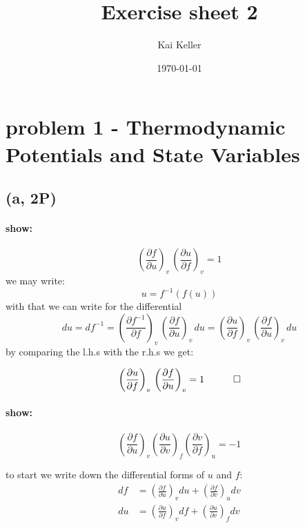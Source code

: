 \documentclass[a4paper]{article}
\title{Exercise sheet 2}
\author{Kai Keller}
\date{\today}
\begin{document}
\maketitle
\tableofcontents

\section{problem 1 - Thermodynamic Potentials and State Variables}
\subsection{(a, 2P)}
\paragraph{show:}
\begin{equation}
    \left(\frac{\partial f}{\partial u}\right)_v \, \left(\frac{\partial u}{\partial f}\right)_v = 1 
\end{equation} 
we may write:
\begin{equation}
    u=f^{-1}\left(f(u)\right)
\end{equation}
with that we can write for the differential
\begin{equation}
    du=df^{-1}=\left(\frac{\partial f^{-1}}{\partial f}\right)_v\,\left(\frac{\partial f}{\partial u}\right)_v\, du=\left(\frac{\partial u}{\partial f}\right)_v\,\left(\frac{\partial f}{\partial u}\right)_v\, du
\end{equation}
by comparing the l.h.s with the r.h.s we get:
\begin{framed}
    \begin{equation}\label{res:1a}
    \left(\frac{\partial u}{\partial f}\right)_v\,\left(\frac{\partial f}{\partial u}\right)_v=1 \quad \qed
\end{equation}
\end{framed}

\paragraph{show:}

\begin{equation}
    \left(\frac{\partial f}{\partial u}\right)_v\left(\frac{\partial u}{\partial v}\right)_f\left(\frac{\partial v}{\partial f}\right)_u=-1
\end{equation}

to start we write down the differential forms of $u$ and $f$:
\begin{align}
    df&=\left(\frac{\partial f}{\partial u}\right)_vdu+\left(\frac{\partial f}{\partial v}\right)_udv \\
    du&=\left(\frac{\partial u}{\partial f}\right)_vdf+\left(\frac{\partial u}{\partial v}\right)_fdv
\end{align}
\end{document}
